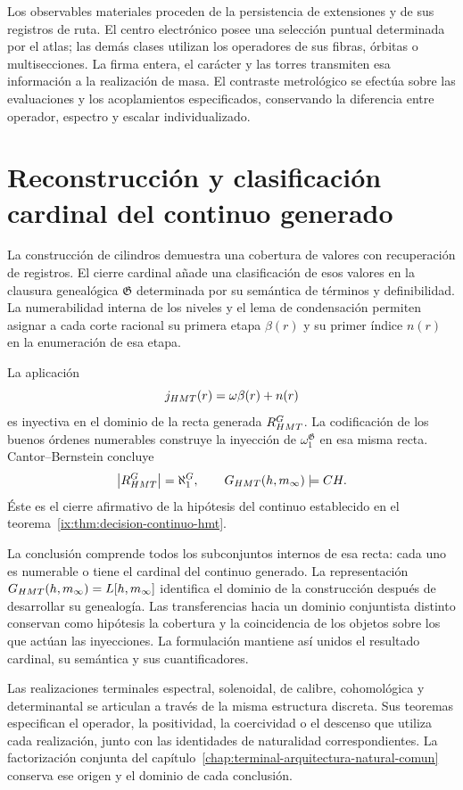 Los observables materiales proceden de la
persistencia de extensiones y de sus registros de
ruta. El centro electrónico posee una selección
puntual determinada por el atlas; las demás clases
utilizan los operadores de sus fibras, órbitas o
multisecciones. La firma entera, el carácter y las
torres transmiten esa información a la realización
de masa. El contraste metrológico se efectúa sobre
las evaluaciones y los acoplamientos especificados,
conservando la diferencia entre operador, espectro
y escalar individualizado.

\section{Reconstrucción y clasificación cardinal del continuo generado}

La construcción de cilindros demuestra una cobertura
de valores con recuperación de registros. El cierre
cardinal añade una clasificación de esos valores en
la clausura genealógica \(\mathfrak G\) determinada
por su semántica de términos y definibilidad. La
numerabilidad interna de los niveles y el lema de
condensación permiten asignar a cada corte racional
su primera etapa \(\beta(r)\) y su primer índice
\(n(r)\) en la enumeración de esa etapa.

La aplicación
\[
 j_{\rm HMT}(r)=\omega\beta(r)+n(r)
\]
es inyectiva en el dominio de la recta generada
\(\mathbb R_{\rm HMT}^{\mathfrak G}\). La
codificación de los buenos órdenes numerables
construye la inyección de
\(\omega_1^{\mathfrak G}\) en esa misma recta.
Cantor--Bernstein concluye
\[
 \left|\mathbb R_{\rm HMT}^{\mathfrak G}\right|
 =\aleph_1^{\mathfrak G},
 \qquad
 \mathfrak G_{\rm HMT}(h,m_\infty)
 \models\mathrm{CH}.
\]
Éste es el cierre afirmativo de la hipótesis del
continuo establecido en el
teorema~\ref{ix:thm:decision-continuo-hmt}.

La conclusión comprende todos los subconjuntos
internos de esa recta: cada uno es numerable o
tiene el cardinal del continuo generado. La
representación
\(\mathfrak G_{\rm HMT}(h,m_\infty)=L[h,m_\infty]\)
identifica el dominio de la construcción después
de desarrollar su genealogía. Las transferencias
hacia un dominio conjuntista distinto conservan
como hipótesis la cobertura y la coincidencia
de los objetos sobre los que actúan las
inyecciones. La formulación mantiene así unidos
el resultado cardinal, su semántica y sus
cuantificadores.

Las realizaciones terminales espectral,
solenoidal, de calibre, cohomológica y
determinantal se articulan a través de la misma
estructura discreta. Sus teoremas especifican
el operador, la positividad, la coercividad o
el descenso que utiliza cada realización,
junto con las identidades de naturalidad
correspondientes. La factorización conjunta
del capítulo~\ref{chap:terminal-arquitectura-natural-comun}
conserva ese origen y el dominio de cada
conclusión.

